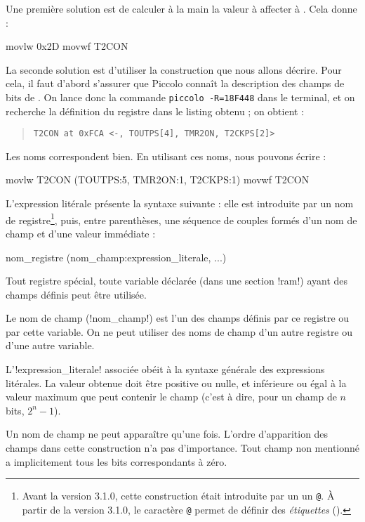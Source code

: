 Une première solution est de calculer à la main la valeur à affecter à . Cela donne :
\begin{piccolo}
movlw   0x2D
movwf   T2CON
\end{piccolo}

La seconde solution est d'utiliser la construction que nous allons décrire. Pour cela, il faut d'abord s’assurer que Piccolo connaît la description des champs de bits de . On lance donc la commande \texttt{piccolo -R=18F448} dans le terminal, et on recherche la définition du registre  dans le listing obtenu ; on obtient :
\begin{quote}
\texttt{\textquotesingle T2CON\textquotesingle~at 0xFCA <-, TOUTPS[4], TMR2ON, T2CKPS[2]>}
\end{quote}

Les noms correspondent bien. En utilisant ces noms, nous pouvons écrire :
\begin{piccolo}
movlw   T2CON (TOUTPS:5, TMR2ON:1, T2CKPS:1)
movwf   T2CON
\end{piccolo}

L'expression litérale présente la syntaxe suivante : elle est introduite par un nom de registre\footnote{Avant la version 3.1.0, cette construction était introduite par un un \texttt{@}. À partir de la version 3.1.0, le caractère \texttt{@} permet de définir des \emph{étiquettes} ().}, puis, entre parenthèses, une séquence de couples formés d’un nom de champ et d’une valeur immédiate :
\begin{piccolo}
  nom_registre (nom_champ:expression_literale, ...)
\end{piccolo}

Tout registre spécial, toute variable déclarée (dans une section \pic!ram!) ayant des champs définis peut être utilisée.

Le nom de champ (\pic!nom_champ!) est l’un des champs définis par ce registre ou par cette variable. On ne peut utiliser des noms de champ d’un autre registre ou d’une autre variable.

L’\pic!expression_literale! associée obéit à la syntaxe générale des expressions litérales. La valeur obtenue doit être positive ou nulle, et inférieure ou égal à la valeur maximum que peut contenir le champ (c’est à dire, pour un champ de $n$ bits, $2^n-1$).

Un nom de champ ne peut apparaître qu’une fois. L’ordre d’apparition des champs dans cette construction n’a pas d’importance. Tout champ non mentionné a implicitement tous les bits correspondants à zéro.


